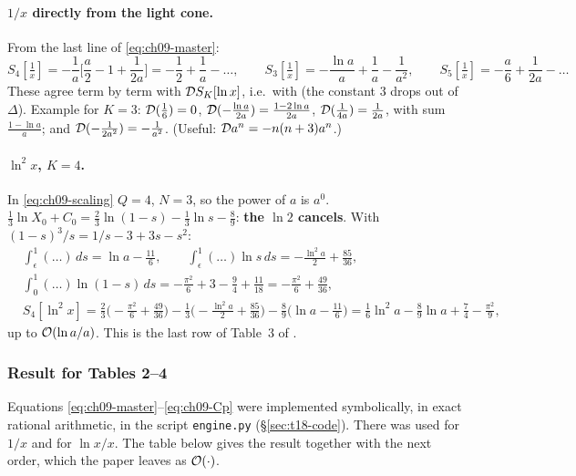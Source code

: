 \paragraph{$1/x$ directly from the light cone.} From the last line of \eqref{eq:ch09-master}:
\begin{equation}
S_4[\tfrac1x]=-\frac1a\Big[\frac a2-1+\frac1{2a}\Big]=-\frac12+\frac1a-\ldots,\qquad
S_3[\tfrac1x]=-\frac{\ln a}a+\frac1a-\frac1{a^2},\qquad
S_5[\tfrac1x]=-\frac a6+\frac1{2a}-\ldots
\label{eq:ch09-S1x}
\end{equation}
These agree term by term with $\mathcal{D} S_K[\ln x]$, i.e.\ with  (the constant $3$ drops out of $\Delta$). Example for $K=3$:
$\mathcal{D}(\tfrac16)=0$, $\mathcal{D}(-\tfrac{\ln a}{2a})=\tfrac{1-2\ln a}{2a}$, $\mathcal{D}(\tfrac1{4a})=\tfrac1{2a}$, with sum $\tfrac{1-\ln a}a$;
and $\mathcal{D}(-\tfrac1{2a^2})=-\tfrac1{a^2}$. (Useful: $\mathcal{D} a^n=-n(n+3)a^n$.)

\paragraph{$\ln^2x$, $K=4$.} In \eqref{eq:ch09-scaling} $Q=4$, $N=3$, so the power of $a$ is $a^0$.
$\tfrac13\ln X_0+C_0=\tfrac23\ln(1-s)-\tfrac13\ln s-\tfrac89$: \textbf{the $\ln2$ cancels}. With $(1-s)^3/s=1/s-3+3s-s^2$:
\begin{equation}
\begin{aligned}
&\int_\epsilon^1(\ldots)\,ds=\ln a-\tfrac{11}6,\qquad
\int_\epsilon^1(\ldots)\ln s\,ds=-\tfrac{\ln^2a}2+\tfrac{85}{36},\\
&\int_0^1(\ldots)\ln(1-s)\,ds=-\tfrac{\pi^2}6+3-\tfrac94+\tfrac{11}{18}=-\tfrac{\pi^2}6+\tfrac{49}{36},\\
&S_4[\ln^2x]=\tfrac23\Big(-\tfrac{\pi^2}6+\tfrac{49}{36}\Big)-\tfrac13\Big(-\tfrac{\ln^2a}2+\tfrac{85}{36}\Big)-\tfrac89\Big(\ln a-\tfrac{11}6\Big)
=\tfrac16\ln^2a-\tfrac89\ln a+\tfrac74-\tfrac{\pi^2}9,
\end{aligned}
\label{eq:ch09-Sln2}
\end{equation}
up to $\mathcal{O}\!\left(\ln a/a\right)$. This is the last row of Table~3 of \PII.

\subsubsection{Result for Tables 2--4}
Equations \eqref{eq:ch09-master}--\eqref{eq:ch09-Cp} were implemented symbolically, in exact rational arithmetic,
in the script \texttt{engine.py} (\S\ref{sec:t18-code}). There  was used for $1/x$ and  for $\ln x/x$.
The table below gives the result \tC{} together with the next order, which the paper leaves as $\mathcal{O}\!\left(\cdot\right)$.

